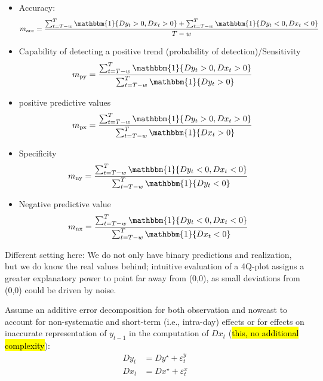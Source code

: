 \documentclass[oneside]{article}
\theoremstyle{plain}%
\theoremstyle{definition}
\newcommand{\ind}[1]{\mathbbm{1}\{#1\}}
\newcommand{\ydiff}{D y}
\newcommand{\ydifft}{Dy^\star}
\newcommand{\xdiff}{Dx}
\newcommand{\xdifft}{Dx^\star}
\begin{document}
\begin{itemize}
  \item Accuracy: \begin{equation}
  	m_{\text{acc}} = \frac{\sum_{t=T-w}^T \ind{\ydiff_t > 0, \xdiff_t > 0} + \sum_{t=T-w}^T \ind{\ydiff_t < 0, \xdiff_t < 0}}{T-w}
\end{equation}
	\item Capability of detecting a positive trend (probability of detection)/Sensitivity
	\begin{equation}
  		m_{\text{py}} = \frac{\sum_{t=T-w}^T \ind{\ydiff_t > 0, \xdiff_t > 0}}{\sum_{t=T-w}^T \ind{\ydiff_t > 0}}
	\end{equation}
	\item positive predictive values
\begin{equation}
  m_{\text{px}} = \frac{\sum_{t=T-w}^T \ind{\ydiff_t > 0, \xdiff_t > 0}}{\sum_{t=T-w}^T \ind{\xdiff_t > 0}}  
\end{equation}
	\item Specificity
	\begin{align}
		m_{\text{ny}} &=  \frac{\sum_{t=T-w}^T \ind{\ydiff_t < 0, \xdiff_t < 0}}{\sum_{t=T-w}^T \ind{\ydiff_t < 0}} 
  \end{align}
  \item Negative predictive value
	\begin{align}
		m_{\text{nx}} &=  \frac{\sum_{t=T-w}^T \ind{\ydiff_t < 0, \xdiff_t < 0}}{\sum_{t=T-w}^T \ind{\xdiff_t < 0}}
	\end{align}
\end{itemize}

Different setting here: We do not only have binary predictions and realization, but we do know the real values behind; intuitive evaluation of a 4Q-plot assigns a greater explanatory power to point far away from (0,0), as small deviations from (0,0) could be driven by noise.

Assume an additive error decomposition for both observation and nowcast to account for non-systematic and short-term (i.e., intra-day) effects or for effects on inaccurate representation of $y_{t-1}$ in the computation of $Dx_t$ (\hl{this, no additional complexity}):
  	\begin{align}\label{additive error decomposition}
  		\ydiff_t &= \ydifft + \varepsilon_t^y \\
  		\xdiff_t &= \xdifft + \varepsilon_t^x
	\end{align}
\end{document}
